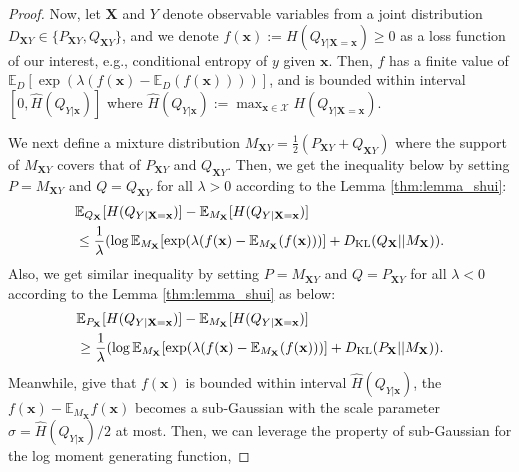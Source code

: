 \begin{proof}
Now, let $\mathbf{X}$ and $Y$ denote observable variables from a joint distribution $D_{\mathbf{X}Y} \in \{P_{\mathbf{X}Y},Q_{\mathbf{X}Y}\}$, and we denote $f(\mathbf{x}):= H(Q_{Y|\mathbf{X}=\mathbf{x}}) \geq 0$ as a loss function of our interest, e.g., conditional entropy of $y$ given $\mathbf{x}$. Then, $f$ has a finite value of $\mathbb{E}_{D}[\exp(\lambda(f(\mathbf{x}) - \mathbb{E}_{D}(f(\mathbf{x}))))]$, and is bounded within interval $[0,\hat{H}(Q_{Y|\mathbf{x}})]$ where $\hat{H}(Q_{Y|\mathbf{x}}):=\max_{\mathbf{x}\in \mathcal{X}} H(Q_{Y|\mathbf{X}=\mathbf{x}})$. 

We next define a mixture distribution $M_{\mathbf{X}Y}=\frac{1}{2}(P_{\mathbf{X}Y}+Q_{\mathbf{X}Y})$ where the support of $M_{\mathbf{X}Y}$ covers that of $P_{\mathbf{X}Y}$ and $Q_{\mathbf{X}Y}$. Then, we get the inequality below by setting $P=M_{\mathbf{X}Y}$ and $Q=Q_{\mathbf{X}Y}$ for all $\lambda > 0$ according to the Lemma \ref{thm:lemma_shui}:
\begin{equation} \label{thm:ineq_pt_for_ub}
\begin{split}
&\mathbb{E}_{ Q_{\mathbf{X}}}[H(Q_{Y|\mathbf{X}=\mathbf{x}})] - \mathbb{E}_{ M_{\mathbf{X}}}[H(Q_{Y|\mathbf{X}=\mathbf{x}})] \\
&\leq \frac{1}{\lambda}(\log\mathbb{E}_{M_{\mathbf{X}}}[\exp(\lambda(f(\mathbf{x}) - \mathbb{E}_{ M_{\mathbf{X}}}(f(\mathbf{x})))] + D_{\rm KL}(Q_{\mathbf{X}}||M_{\mathbf{X}})).
\end{split}
\end{equation} 
Also, we get similar inequality by setting $P=M_{\mathbf{X}Y}$ and $Q=P_{\mathbf{X}Y}$ for all $\lambda < 0$ according to the Lemma \ref{thm:lemma_shui} as below:
\begin{equation} \label{thm:ineq_ps_for_ub}
\begin{split}
&\mathbb{E}_{P_{\mathbf{X}}}[H(Q_{Y|\mathbf{X}=\mathbf{x}})] - \mathbb{E}_{M_{\mathbf{X}}}[H(Q_{Y|\mathbf{X}=\mathbf{x}})] \\
&\geq \frac{1}{\lambda}(\log\mathbb{E}_{M_{\mathbf{X}}}[\exp(\lambda(f(\mathbf{x}) - \mathbb{E}_{M_{\mathbf{X}}}(f(\mathbf{x})))] + D_{\rm KL}(P_{\mathbf{X}}||M_{\mathbf{X}})).
\end{split}
\end{equation} 
Meanwhile, give that $f(\mathbf{x})$ is bounded within interval $\hat{H}(Q_{Y|\mathbf{x}})$, the $f(\mathbf{x})-\mathbb{E}_{M_{\mathbf{X}}}f(\mathbf{x})$ becomes a sub-Gaussian \cite{wainwright2019high} with the scale parameter $\sigma=\hat{H}(Q_{Y|\mathbf{x}})/2$ at most. Then, we can leverage the property of sub-Gaussian for the log moment generating function, 

\end{proof}
